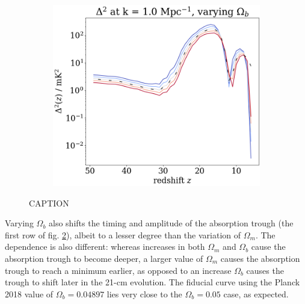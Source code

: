 \documentclass[floats,floatfix,showpacs,amssymb,prd,superscriptaddress,nofootinbib]{revtex4-2} %
\begin{document}
\begin{figure}[H]
\begin{subfigure}[b]{0.45\textwidth}
     \end{subfigure}
     \hfill
     \begin{subfigure}[b]{0.45\textwidth}
         \centering
         \includegraphics[width=\textwidth]{images/simulation_results/power_spectrum_fixed_k_1.0_Ob.png}
         \label{fig:power_spectrum_fixed_k_1.0_Ob}
     \end{subfigure}
        \caption{CAPTION}
        \label{fig:simulation_results_Ob}
\end{figure}

Varying $\Omega_b$ also shifts the timing and amplitude of the absorption trough (the first row of fig. \ref{fig:simulation_results_Ob}), albeit to a lesser degree than the variation of $\Omega_m$. The dependence is also different: whereas increases in both $\Omega_m$ and $\Omega_b$ cause the absorption trough to become deeper, a larger value of $\Omega_m$ causes the absorption trough to reach a minimum earlier, as opposed to an increase $\Omega_b$ causes the trough to shift later in the 21-cm evolution. The fiducial curve using the  Planck 2018 value of $\Omega_b = 0.04897$ lies very close to the $\Omega_b = 0.05$ case, as expected.
\end{document}
